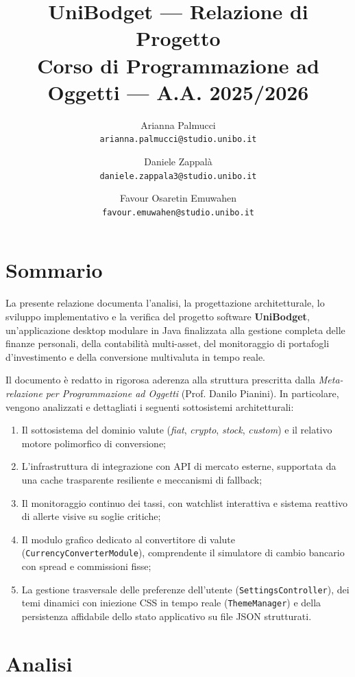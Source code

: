 \documentclass[11pt,a4paper,openright]{report}
\title{\textbf{UniBodget — Relazione di Progetto} \\
\large Corso di Programmazione ad Oggetti --- A.A. 2025/2026}
\author{%
Arianna Palmucci\\{\small\texttt{arianna.palmucci@studio.unibo.it}}
\and
Daniele Zappalà\\{\small\texttt{daniele.zappala3@studio.unibo.it}}
\and
Favour Osaretin Emuwahen\\{\small\texttt{favour.emuwahen@studio.unibo.it}}
}
\begin{document}
\maketitle

\chapter*{Sommario}
La presente relazione documenta l'analisi, la progettazione architetturale, lo sviluppo implementativo e la verifica del progetto software \textbf{UniBodget}, un'applicazione desktop modulare in Java finalizzata alla gestione completa delle finanze personali, della contabilità multi-asset, del monitoraggio di portafogli d'investimento e della conversione multivaluta in tempo reale.

Il documento è redatto in rigorosa aderenza alla struttura prescritta dalla \emph{Meta-relazione per Programmazione ad Oggetti} (Prof. Danilo Pianini). In particolare, vengono analizzati e dettagliati i seguenti sottosistemi architetturali:
\begin{enumerate}
  \item Il sottosistema del dominio valute (\emph{fiat}, \emph{crypto}, \emph{stock}, \emph{custom}) e il relativo motore polimorfico di conversione;
  \item L'infrastruttura di integrazione con API di mercato esterne, supportata da una cache trasparente resiliente e meccanismi di fallback;
  \item Il monitoraggio continuo dei tassi, con watchlist interattiva e sistema reattivo di allerte visive su soglie critiche;
  \item Il modulo grafico dedicato al convertitore di valute (\texttt{CurrencyConverterModule}), comprendente il simulatore di cambio bancario con spread e commissioni fisse;
  \item La gestione trasversale delle preferenze dell'utente (\texttt{SettingsController}), dei temi dinamici con iniezione CSS in tempo reale (\texttt{ThemeManager}) e della persistenza affidabile dello stato applicativo su file JSON strutturati.
\end{enumerate}

\tableofcontents

\chapter{Analisi}
\end{document}
